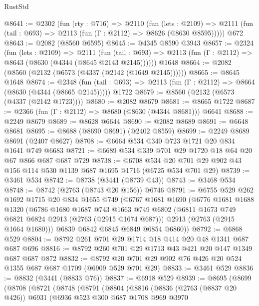 \begin{lexlean}{RustStd}
\begin{coremodule}
@8641 := @2302
    (fun (rty : @716) =>
    @2110
      (fun (lets : @2109) =>
      @2111 (fun (tail : @693) => @2113 (fun (Γ : @2112) => @8626 (@8630 @8595)))))
    @672
@8643 := @2082 (@8560 @6595)
@8645 := @4345 @8590 @3943
@8657 := @2324
    (fun (lets : @2109) =>
    @2111
      (fun (tail : @693) => @2113 (fun (Γ : @2112) => @8643 (@8630 (@4344 (@8645 @2143 @2145))))))
    @1648
@8664 := @2082 (@8560 (@2132 (@6573 (@4337 (@2142 (@1649 @2145))))))
@8665 := @8645 @1648
@8674 := @2348
    (fun (tail : @693) => @2113 (fun (Γ : @2112) => @8664 (@8630 (@4344 (@8665 @2145)))))
    @1722
@8679 := @8560 (@2132 (@6573 (@4337 (@2142 @1723))))
@8680 := @2082 @8679
@8681 := @8665 @1722
@8687 := @2366 (fun (Γ : @2112) => @8680 (@8630 (@4344 @8681))) @6641
@8688 := @2249 @8679
@8689 := @8628 @6644
@8690 := @2082 @8689
@8691 := @6648 @8681
@8695 := @8688 (@8690 @8691) (@2402 @8559)
@8699 := @2249 @8689 @8691 (@2407 @8627)
@8708 := @6664 @534 @340 @723 @1721 @20 @834 @1641 @749 @6683
@8721 := @6689 @534 @339 @701 @29 @1720 @18 @64 @20 @67 @866 @687 @687 @729
@8738 := @6708
    @534
    @20
    @701
    @29
    @902
    @43
    @156
    @114
    @530
    @1139
    @687
    @1695
    @1716
    (@6725 @534 @701 @29)
@8739 := @3461 @534
@8742 := @8738 (@3441 (@8739 @43))
@8743 := @3468 @534
@8748 := @8742 (@2763 (@8743 @20 @156)) @6746
@8791 := @6755
    @529
    @262
    @1692
    @1715
    @20
    @834
    @1655
    @749
    (@6767
      @1681
      @1690
      (@6776
        @1681
        @1688
        @1320
        (@6786
          @1680
          @1687
          @743
          @1663
          @749
          @6802
          (@6811 @1673 @749 @6821 @6824 @2913 (@2763 (@2915 @1674 @687)))
          @2913
          (@2763 (@2915 @1664 @1680)))
        @6839
        @6842
        @6845
        @6849
        @6854
        @6860))
@8792 := @6868 @529
@8804 := @8792 @261 @701 @29 @1714 @18 @414 @20 @48 @1341 @687 @687 @696
@8816 := @8792 @260 @701 @29 @1713 @43 @421 @20 @147 @1349 @687 @687 @872
@8832 := @8792 @20 @701 @29 @902 @76 @426 @20 @524 @1355 @687 @687 @1709 (@6909 @529 @701 @29)
@8833 := @3461 @529
@8836 := @8832 (@3441 (@8833 @76))
@8837 := @6918 @529
@8939 := @8695
    (@8699
      (@8708
        (@8721
          (@8748
            (@8791
              (@8804
                (@8816
                  (@8836
                    (@2763 (@8837 @20 @426))
                    @6931
                    (@6936
                      @523
                      @300
                      @687
                      @1708
                      @969
                      @3970

\end{coremodule}
\end{lexlean}

